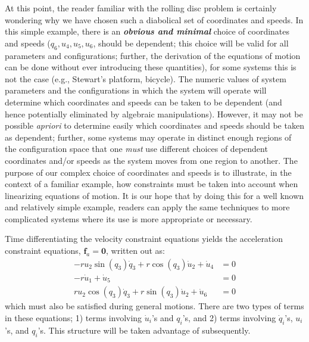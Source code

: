 \documentclass[smallcondensed,final]{svjour3}                     %
\begin{document}
At this point, the reader familiar with the rolling disc problem is certainly
wondering why we have chosen such a diabolical set of coordinates and speeds.
In this simple example, there is an {\bf \textit{obvious and minimal}} choice of
coordinates and speeds ($q_6, u_4, u_5, u_6$, should be dependent; this choice
will be valid for all parameters and configurations; further, the derivation of
the equations of motion can be done without ever introducing these quantities),
for some systems this is not the case (e.g., Stewart's platform, bicycle). The
numeric values of system parameters and the configurations in which the system
will operate will determine which coordinates and speeds can be taken to be
dependent (and hence potentially eliminated by algebraic manipulations).
However, it may not be possible \textit{apriori} to determine easily which
coordinates and speeds should be taken as dependent; further, some systems may
operate in distinct enough regions of the configuration space that one
\textit{must} use different choices of dependent coordinates and/or speeds as
the system moves from one region to another. The purpose of our complex
choice of coordinates and speeds is to illustrate, in the context of a familiar
example, how constraints must be taken into account when linearizing equations
of motion. It is our hope that by doing this for a well known and relatively
simple example, readers can apply the same techniques to more complicated
systems where its use is more appropriate or necessary.

Time differentiating the velocity constraint equations yields the acceleration
constraint equations, $\mathbf{f}_a = \mathbf{0}$, written out as:
\begin{subequations}
\label{rd:f_a}
\begin{align}
    -r u_{2} \sin(q_{3}) \dot{q}_{3} + r \cos(q_{3}) \dot{u}_{2} + \dot{u}_{4} &=
    0\\
    - r \dot{u}_{1} + \dot{u}_{5} &= 0\\
    r u_{2} \cos(q_{3}) \dot{q}_{3} + r \sin(q_{3}) \dot{u}_{2} + \dot{u}_{6} &=
    0
\end{align}
\end{subequations}
which must also be satisfied during general motions. There are two types of
terms in these equations; 1) terms involving $\dot{u}_i$'s and $q_i$'s, and 2)
terms involving $\dot{q}_i$'s, $u_i$'s, and $q_i$'s. This structure will be
taken advantage of subsequently.
\end{document}
